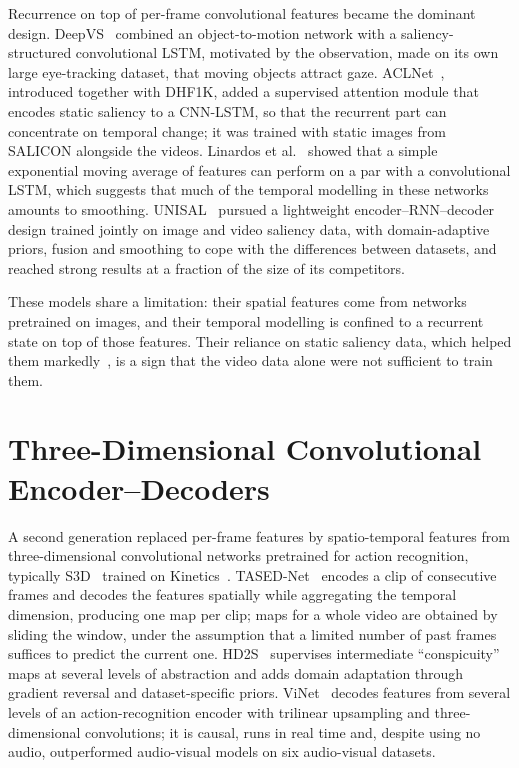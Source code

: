 Recurrence on top of per-frame convolutional features became the dominant
design. DeepVS~\cite{jiang2018deepvs} combined an object-to-motion network with
a saliency-structured convolutional \acrshort{LSTM}, motivated by the observation, made
on its own large eye-tracking dataset, that moving objects attract gaze.
ACLNet~\cite{wang2018revisiting,wang2021revisiting}, introduced together with
DHF1K, added a supervised attention module that encodes static saliency to a
\acrshort{CNN}-\acrshort{LSTM}, so that the recurrent part can concentrate on temporal change; it was
trained with static images from SALICON alongside the videos. Linardos et
al.~\cite{linardos2019simple} showed that a simple exponential moving average
of features can perform on a par with a convolutional \acrshort{LSTM}, which suggests that
much of the temporal modelling in these networks amounts to smoothing.
UNISAL~\cite{droste2020unified} pursued a lightweight encoder--\acrshort{RNN}--decoder
design trained jointly on image and video saliency data, with domain-adaptive
priors, fusion and smoothing to cope with the differences between datasets,
and reached strong results at a fraction of the size of its competitors.

These models share a limitation: their spatial features come from networks
pretrained on images, and their temporal modelling is confined to a recurrent
state on top of those features. Their reliance on static saliency data, which
helped them markedly~\cite{wang2021revisiting}, is a sign that the video data
alone were not sufficient to train them.

\section{Three-Dimensional Convolutional Encoder--Decoders}\label{sec:related-3d}

A second generation replaced per-frame features by spatio-temporal features
from three-dimensional convolutional networks pretrained for action
recognition, typically S3D~\cite{xie2018rethinking} trained on
Kinetics~\cite{carreira2017quo}. TASED-Net~\cite{min2019tased} encodes a clip of
consecutive frames and decodes the features spatially while aggregating the
temporal dimension, producing one map per clip; maps for a whole video are
obtained by sliding the window, under the assumption that a limited number of
past frames suffices to predict the current one. HD2S~\cite{bellitto2021hierarchical}
supervises intermediate \enquote{conspicuity} maps at several levels of
abstraction and adds domain adaptation through gradient reversal and
dataset-specific priors. ViNet~\cite{jain2021vinet} decodes features from
several levels of an action-recognition encoder with trilinear upsampling and
three-dimensional convolutions; it is causal, runs in real time and, despite
using no audio, outperformed audio-visual models on six audio-visual datasets.

